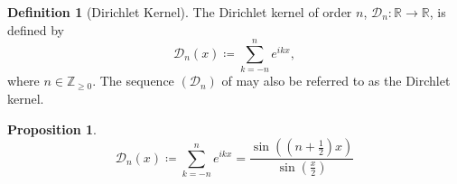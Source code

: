 \documentclass[a4paper]{article}
\newtheorem{proposition}[theorem]{Proposition}
\theoremstyle{definition}
\newtheorem{definition}{Definition}
\begin{document}
\begin{definition}[Dirichlet Kernel]
    The Dirichlet kernel of order $n$, $\mathcal{D}_n: \mathbb{R} \to \mathbb{R}$, is defined by
    \begin{equation}
        \mathcal{D}_n(x) \coloneq \sum_{k = -n}^{n} e^{ikx},
    \end{equation}
    where $n \in \mathbb{Z}_{\geq 0}$.
    The sequence $(\mathcal{D}_n)$ of may also be referred to as the Dirchlet kernel.
\end{definition}
\begin{proposition} \label{thm:Dirichlet kernel proposition 1}
    \begin{equation*}
        \mathcal{D}_n(x) \coloneq \sum_{k = -n}^{n} e^{ikx} = \frac{\sin\left(\left(n + \frac{1}{2}\right)x\right)}{\sin\left(\frac{x}{2}\right)}
    \end{equation*}
\end{proposition}
\end{document}
